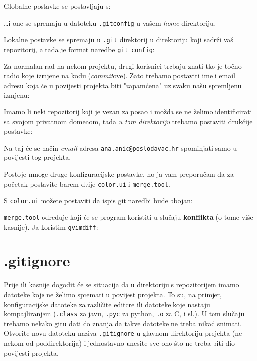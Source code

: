 Globalne postavke se postavljaju s:


\dots{}i one se spremaju u datoteku \verb+.gitconfig+ u vašem \emph{home} direktoriju.

Lokalne postavke se spremaju u \verb+.git+ direktorij u direktoriju koji sadrži vaš repozitorij, a tada je format naredbe \verb+git config+:


Za normalan rad na nekom projektu, drugi korisnici trebaju znati tko je točno radio koje izmjene na kodu (\emph{commit}ove).
Zato trebamo postaviti ime i email adresu koja će u povijesti projekta biti "zapamćena" uz svaku našu spremljenu izmjenu:



Imamo li neki repozitorij koji je vezan za posao i možda se ne želimo identificirati sa svojom privatnom domenom, tada \emph{u tom direktoriju} trebamo postaviti drukčije postavke:



Na taj će se način \emph{email} adresa \verb+ana.anic@poslodavac.hr+ spominjati samo u povijesti tog projekta.

Postoje mnoge druge konfiguracijske postavke, no ja vam preporučam da za početak postavite barem dvije \verb+color.ui+ i \verb+merge.tool+.

S \verb+color.ui+ možete postaviti da ispis git naredbi bude obojan:



\verb+merge.tool+ određuje koji će se program koristiti u slučaju \textbf{konflikta} (o tome više kasnije). Ja koristim \verb+gvimdiff+:



\section*{.gitignore}

Prije ili kasnije dogodit će se situacija da u direktoriju s repozitorijem imamo datoteke koje ne želimo spremati u povijest projekta.
To su, na primjer, konfiguracijske datoteke za različite editore ili datoteke koje nastaju kompajliranjem (\verb+.class+ za javu, \verb+.pyc+ za python, \verb+.o+ za C, i sl.).
U tom slučaju trebamo nekako gitu dati do znanja da takve datoteke ne treba nikad snimati.
Otvorite novu datoteku naziva \verb+.gitignore+ u glavnom direktoriju projekta (ne nekom od poddirektorija) i jednostavno unesite sve ono što ne treba biti dio povijesti projekta.

